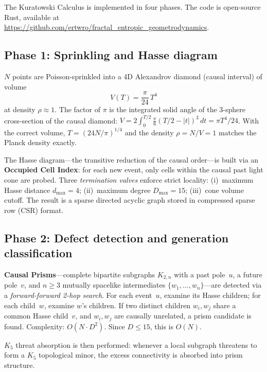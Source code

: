 \documentclass[aps,prd,twocolumn,superscriptaddress,nofootinbib,amsmath,amssymb,longbibliography]{revtex4-2}
\newcommand{\Kbn}{K_{2,n}}
\begin{document}
The Kuratowski Calculus is implemented in four phases.
The code is open-source Rust, available at
\url{https://github.com/ertwro/fractal_entropic_geometrodynamics}.

\subsection{Phase 1: Sprinkling and Hasse diagram}

$N$ points are Poisson-sprinkled into a 4D Alexandrov diamond (causal
interval) of volume
\begin{equation}\label{eq:diamond_volume}
  V(T) = \frac{\pi}{24}\,T^4
\end{equation}
at density $\rho \approx 1$.
The factor of $\pi$ is the integrated solid angle of the 3-sphere
cross-section of the causal diamond: $V = 2\int_0^{T/2}
\frac{\pi}{6}(T/2 - |t|)^3\,dt = \pi T^4/24$.
With the correct volume, $T = (24N/\pi)^{1/4}$ and the density
$\rho = N/V = 1$ matches the Planck density exactly.

The Hasse diagram---the transitive reduction of the causal order---is
built via an \textbf{Occupied Cell Index}: for each new event, only
cells within the causal past light cone are probed.
Three \emph{termination valves} enforce strict locality:
(i)~maximum Hasse distance $d_{\max} = 4$;
(ii)~maximum degree $D_{\max} = 15$;
(iii)~cone volume cutoff.
The result is a sparse directed acyclic graph stored in compressed
sparse row (CSR) format.

\subsection{Phase 2: Defect detection and generation classification}

\textbf{Causal Prisms}---complete bipartite subgraphs $\Kbn$ with a
past pole~$u$, a future pole~$v$, and $n \geq 3$ mutually spacelike
intermediates $\{w_1, \ldots, w_n\}$---are detected via a
\emph{forward-forward 2-hop search}.
For each event~$u$, examine its Hasse children; for each child~$w$,
examine $w$'s children.  If two distinct children $w_i, w_j$ share a
common Hasse child~$v$, and $w_i, w_j$ are causally unrelated, a
prism candidate is found.
Complexity: $O(N \cdot D^2)$.  Since $D \leq 15$, this is $O(N)$.

$K_5$ threat absorption is then performed: whenever a local subgraph
threatens to form a $K_5$ topological minor, the excess connectivity
is absorbed into prism structure.
\end{document}
